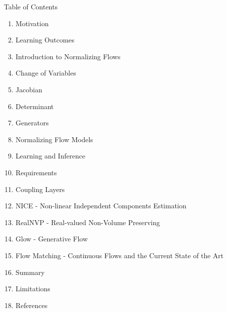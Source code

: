 \begin{frame}[allowframebreaks]{Table of Contents}
\begin{enumerate}
    \item Motivation
    \item Learning Outcomes
    \item Introduction to Normalizing Flows
    \item Change of Variables
    \item Jacobian
    \item Determinant
    \item Generators
    \item Normalizing Flow Models
    \item Learning and Inference
    \item Requirements
    \item Coupling Layers
    \item NICE - Non-linear Independent Components Estimation
    \item RealNVP - Real-valued Non-Volume Preserving
    \item Glow - Generative Flow
    \item Flow Matching - Continuous Flows and the Current State of the Art
    \item Summary
    \item Limitations
    \item References
\end{enumerate}
\end{frame}